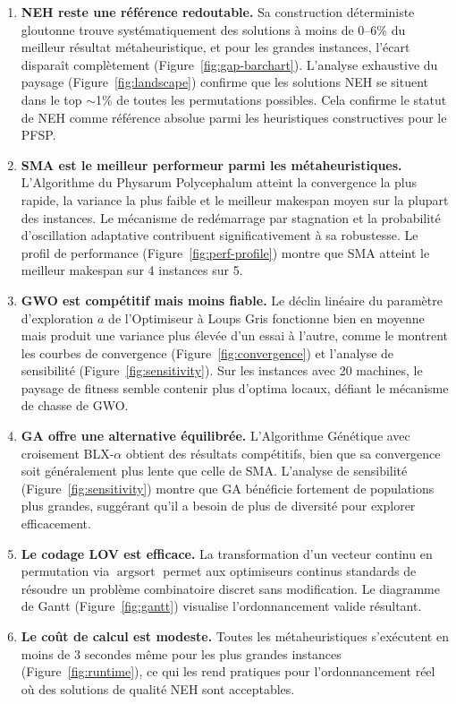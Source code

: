\documentclass[12pt,a4paper,oneside]{report}
\begin{document}
\begin{enumerate}[itemsep=6pt]
    \item \textbf{NEH reste une r\'ef\'erence redoutable.} Sa construction d\'eterministe gloutonne trouve syst\'ematiquement des solutions \`a moins de 0--6\% du meilleur r\'esultat m\'etaheuristique, et pour les grandes instances, l'\'ecart dispara\^it compl\`etement (Figure~\ref{fig:gap-barchart}). L'analyse exhaustive du paysage (Figure~\ref{fig:landscape}) confirme que les solutions NEH se situent dans le top $\sim$1\% de toutes les permutations possibles. Cela confirme le statut de NEH comme r\'ef\'erence absolue parmi les heuristiques constructives pour le PFSP.

    \item \textbf{SMA est le meilleur performeur parmi les m\'etaheuristiques.} L'Algorithme du Physarum Polycephalum atteint la convergence la plus rapide, la variance la plus faible et le meilleur makespan moyen sur la plupart des instances. Le m\'ecanisme de red\'emarrage par stagnation et la probabilit\'e d'oscillation adaptative contribuent significativement \`a sa robustesse. Le profil de performance (Figure~\ref{fig:perf-profile}) montre que SMA atteint le meilleur makespan sur 4 instances sur 5.

    \item \textbf{GWO est comp\'etitif mais moins fiable.} Le d\'eclin lin\'eaire du param\`etre d'exploration $a$ de l'Optimiseur \`a Loups Gris fonctionne bien en moyenne mais produit une variance plus \'elev\'ee d'un essai \`a l'autre, comme le montrent les courbes de convergence (Figure~\ref{fig:convergence}) et l'analyse de sensibilit\'e (Figure~\ref{fig:sensitivity}). Sur les instances avec 20 machines, le paysage de fitness semble contenir plus d'optima locaux, d\'efiant le m\'ecanisme de chasse de GWO.

    \item \textbf{GA offre une alternative \'equilibr\'ee.} L'Algorithme G\'en\'etique avec croisement BLX-$\alpha$ obtient des r\'esultats comp\'etitifs, bien que sa convergence soit g\'en\'eralement plus lente que celle de SMA. L'analyse de sensibilit\'e (Figure~\ref{fig:sensitivity}) montre que GA b\'en\'eficie fortement de populations plus grandes, sugg\'erant qu'il a besoin de plus de diversit\'e pour explorer efficacement.

    \item \textbf{Le codage LOV est efficace.} La transformation d'un vecteur continu en permutation via $\operatorname{argsort}$ permet aux optimiseurs continus standards de r\'esoudre un probl\`eme combinatoire discret sans modification. Le diagramme de Gantt (Figure~\ref{fig:gantt}) visualise l'ordonnancement valide r\'esultant.

    \item \textbf{Le co\^ut de calcul est modeste.} Toutes les m\'etaheuristiques s'ex\'ecutent en moins de 3 secondes m\^eme pour les plus grandes instances (Figure~\ref{fig:runtime}), ce qui les rend pratiques pour l'ordonnancement r\'eel o\`u des solutions de qualit\'e NEH sont acceptables.
\end{enumerate}
\end{document}
